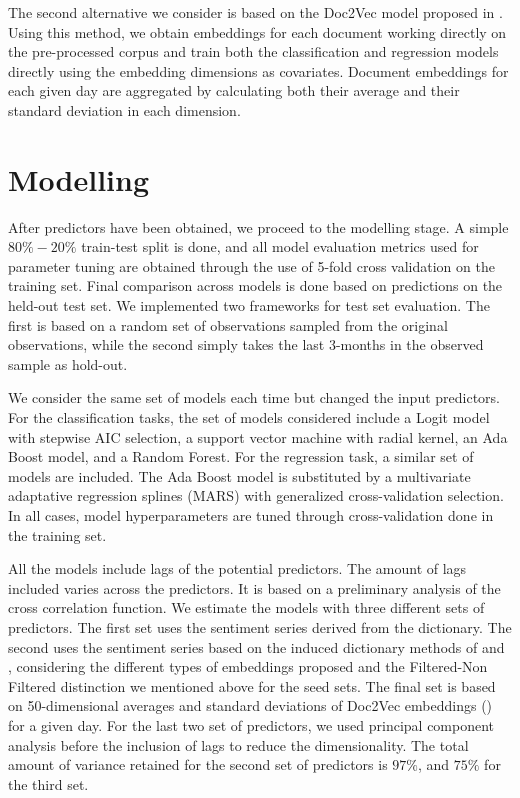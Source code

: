 \documentclass[a4paper, 12pt]{report}
\begin{document}
    The second alternative we consider is based on the Doc2Vec model proposed in \textcite{Le:2014}. Using this method, we obtain embeddings for each document working directly on the pre-processed corpus and train both the classification and regression models directly using the embedding dimensions as covariates. Document embeddings for each given day are aggregated by calculating both their average and their standard deviation in each dimension. 
    
    \section{Modelling}
    \label{model}
    
    After predictors have been obtained, we proceed to the modelling stage. A simple $80\%-20\%$ train-test split is done, and all model evaluation metrics used for parameter tuning are obtained through the use of 5-fold cross validation on the training set. Final comparison across models is done based on predictions on the held-out test set. We implemented two frameworks for test set evaluation. The first is based on a random set of observations sampled from the original observations, while the second simply takes the last 3-months in the observed sample as hold-out. 
    
    We consider the same set of models each time but changed the input predictors. For the classification tasks, the set of models considered include a Logit model with stepwise AIC selection, a support vector machine with radial kernel, an Ada Boost model, and a Random Forest. For the regression task, a similar set of models are included. The Ada Boost model is substituted by a multivariate adaptative regression splines (MARS) with generalized cross-validation selection. In all cases, model hyperparameters are tuned through cross-validation done in the training set.
    
    All the models include lags of the potential predictors. The amount of lags included varies across the predictors. It is based on a preliminary analysis of the cross correlation function. We estimate the models with three different sets of predictors. The first set uses the sentiment series derived from the \textcite{Loughran:2011} dictionary. The second  uses the sentiment series based on the induced dictionary methods of \textcite{An:2018} and \textcite{Hamilton:2016}, considering the different types of embeddings proposed and the Filtered-Non Filtered distinction we mentioned above for the seed sets. The final set is based on 50-dimensional averages and standard deviations of Doc2Vec embeddings (\textcite{Le:2014}) for a given day. For the last two set of predictors, we used principal component analysis before the inclusion of lags to reduce the dimensionality. The total amount of variance retained for the second set of predictors is $97\%$, and $75\%$ for the third set.
    
\end{document}
